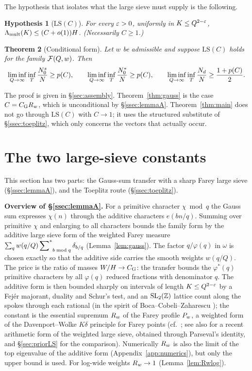 \documentclass[11pt]{amsart}
\newtheorem{theorem}{Theorem}[section]
\newtheorem{hypothesis}[theorem]{Hypothesis}
\theoremstyle{definition}
\theoremstyle{remark}
\numberwithin{equation}{section}
\begin{document}
The hypothesis that isolates what the large sieve must supply is the following.

\begin{hypothesis}[$\mathrm{LS}(C)$]\label{hyp:LS}
For every $\varepsilon>0$, uniformly in $K\le Q^{2-\varepsilon}$, $\Lambda_{\mathrm{mult}}(K)\le(C+o(1))H$. (Necessarily $C\ge1$.)
\end{hypothesis}

\begin{theorem}[Conditional form]\label{thm:conditional}
Let $w$ be admissible and suppose $\mathrm{LS}(C)$ holds for the family $\mathcal F(Q,w)$. Then
\[
\liminf_{Q\to\infty}\inf_T\frac{N^s_0}N\ge p(C),\qquad\liminf_{Q\to\infty}\inf_T\frac{N^*_0}N\ge p(C),\qquad\liminf_{Q\to\infty}\inf_T\frac{N_d}N\ge\frac{1+p(C)}2 .
\]
\end{theorem}
The proof is given in \S\ref{sec:assembly}. Theorem~\ref{thm:gauss} is the case $C=C_{\mathrm G}R_w$, which is unconditional by \S\ref{ssec:lemmaA}. Theorem~\ref{thm:main} does not go through $\mathrm{LS}(C)$ with $C\to1$; it uses the structured substitute of \S\ref{ssec:toeplitz}, which only concerns the vectors that actually occur.

\section{The two large-sieve constants}\label{sec:constants}

This section has two parts: the Gauss-sum transfer with a sharp Farey large sieve (\S\ref{ssec:lemmaA}), and the Toeplitz route (\S\ref{ssec:toeplitz}).

\medskip\noindent\textbf{Overview of \S\ref{ssec:lemmaA}.} For a primitive character $\chi\bmod q$ the Gauss sum expresses $\chi(n)$ through the additive characters $e(bn/q)$. Summing over primitive $\chi$ and enlarging to all characters bounds the family form by the additive large sieve form of the weighted Farey measure $\sum_qw(q/Q)\sideset{}{^{*}}\sum_{b\bmod q}\delta_{b/q}$ (Lemma~\ref{lem:gauss}). The factor $q/\varphi(q)$ in $\omega$ is chosen exactly so that the additive side carries the smooth weights $w(q/Q)$. The price is the ratio of masses $W/H\to C_{\mathrm G}$: the transfer bounds the $\varphi^*(q)$ primitive characters by all $\varphi(q)$ reduced fractions with denominator $q$. The additive form is then bounded sharply on intervals of length $K\le Q^{2-\varepsilon}$ by a Fej\'er majorant, duality and Schur's test, and an $\mathrm{SL}_2(\mathbb Z)$ lattice count along the spokes through each rational (in the spirit of Boca--Cobeli--Zaharescu \cite{BCZ01}); the constant is the essential supremum $R_w$ of the Farey profile $P_w$, a weighted form of the Davenport--Wolke $K\delta$ principle for Farey points (cf.\ \cite{Wol71,Bai06,Ram09,BZ05}; see also \cite{Ram26} for a recent arithmetic form of the weighted large sieve, obtained through Parseval's identity, and \S\ref{sec:priorLS} for the comparison). Numerically $R_w$ is also the limit of the top eigenvalue of the additive form (Appendix~\ref{app:numerics}), but only the upper bound is used. For log-wide weights $R_w\to1$ (Lemma~\ref{lem:Rwlog}).
\end{document}

